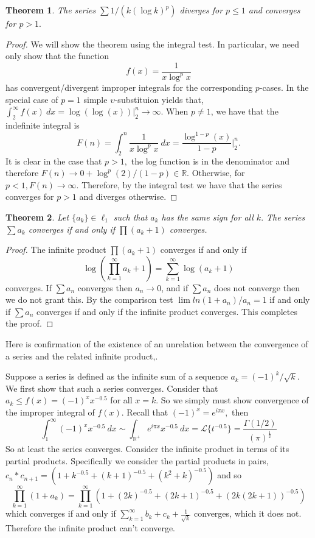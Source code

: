 \documentclass[letter]{article}
\newtheorem{theorem}{Theorem}
\newenvironment{menumerate}{%
  \edef\backupindent{\the\parindent}%
  \enumerate%
  \setlength{\parindent}{\backupindent}%
}{\endenumerate}
\begin{document}
\begin{menumerate}
		\item \begin{theorem}
			The series $\sum 1/(k(\log k)^p)$ diverges for $p \leq 1$ and converges for $p > 1.$
		\end{theorem}
		\begin{proof}
		 We will show the theorem using the integral test. In particular, we need only show that the function $$f(x) = \frac{1}{x\log^px}$$ has convergent/divergent improper integrals for the corresponding $p$-cases. In the special case of $p = 1$ simple $\upsilon$-substituion yields that, $\int_2^\infty f(x)\ dx =  \log(\log(x))|_2^n \to \infty.$ When $p \neq 1$, we have that the indefinite integral is $$F(n) = \int_2^n \frac{1}{x\log^px}\ dx = \frac{\log^{1-p}(x)}{1-p}\Bigg|_2^n.$$ It is clear in the  case that $p>1,$ the log function is in the denominator and therefore $F(n) \to 0 + \log^p(2)/(1-p) \in \mathbb{R}.$ Otherwise, for $p < 1, F(n) \to \infty.$ Therefore, by the integral test we have that the series converges for $p >1$ and diverges otherwise.
		\end{proof}

		\setcounter{enumi}{66}
		\item
		\begin{theorem}
			Let $\{a_k\} \in \ell_1$ such that $a_k$ has the same sign for all $k.$
			The series $\sum a_k$ converges if and only if $\prod (a_k +1)$ converges.
		\end{theorem}
		\begin{proof}
			The infinite product $\prod (a_k +1)$ converges if and only if $$\log\left(\prod_{k =1}^\infty a_k +1\right) = \sum_{k=1}^\infty \log(a_k+1)$$ converges. If $\sum a_n $ converges then $a_n \to 0$, and if $\sum a_n$ does not converge then we do not grant this. By the comparison test $\lim ln(1+a_n)/a_n = 1$ if and only if $\sum a_n$ converges if and only if the infinite product converges. This completes the proof.  
		\end{proof}
		\item Here is confirmation of the existence of an unrelation between the convergence of a series and the related infinite product,.
		\begin{menumerate}
			\item Suppose a series is defined as the infinite sum of a sequence $a_k = (-1)^k/\sqrt{k}$. We first show that such a series converges. Consider that $a_k \leq f(x) = (-1)^xx^{-0.5}$ for all $x = k.$ So we simply must show convergence of the improper integral of $f(x)$. Recall that $(-1)^x = e^{i\pi x},$ then
			$$\int_1^\infty(-1)^xx^{-0.5}\ dx \sim \int_{\mathbb{R}^+} e^{i\pi x} x^{-0.5}\ dx = \mathcal{L}\{t^{-0.5}\} = \frac{\Gamma(1/2)}{(\pi)^{\frac{1}{2}}}$$
			So at least the series converges. Consider the infinite product in terms of its partial products. Specifically we consider the partial products in pairs, $c_n*c_{n+1} = (1 +k^{-0.5} + (k+1)^{-0.5} + (k^2+k)^{-0.5})$ and so $$\prod_{k=1}^\infty (1 + a_k)=  \prod_{k=1}^\infty (1 +(2k)^{-0.5} + (2k+1)^{-0.5} + (2k(2k+1))^{-0.5})$$  
			which converges if and only if $\sum_{k=1}^\infty b_k + c_k + \frac{1}{\sqrt k}$ converges, which it does not. Therefore the infinite product can't converge.


\end{menumerate}
\end{menumerate}
\end{document}

